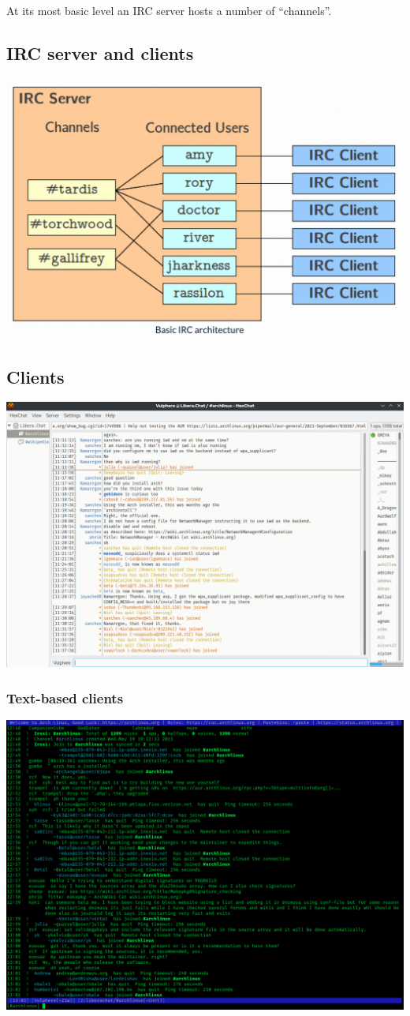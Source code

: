 \documentclass[slides]{pgnotes}
\begin{document}
At its most basic level an IRC server hosts a number of ``channels''.

\subsection{IRC server and clients}

\begin{center}
\includegraphics[width=0.6\linewidth]{basic_irc}
\end{center}


\subsection{Clients}

\begin{center}
  \includegraphics[width=0.6\linewidth]{hexchat}
\end{center}

\newpage
\subsubsection{Text-based clients}

\begin{center}
  \includegraphics[width=0.5\linewidth]{irssi}
\end{center}
\end{document}
